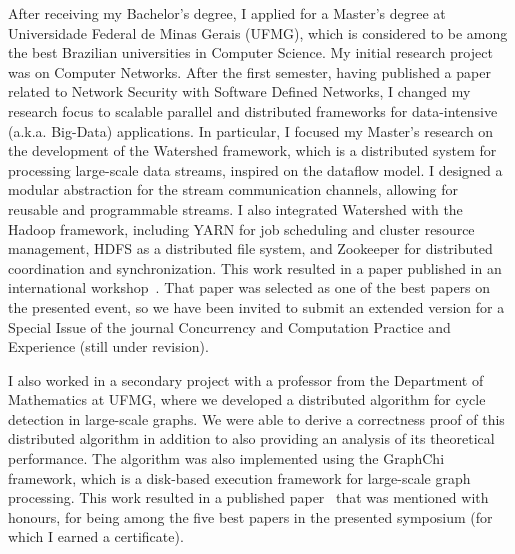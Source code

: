 \documentclass{article}
\begin{document}
After receiving my Bachelor's degree,
I applied for a Master's degree at
Universidade Federal de Minas Gerais (UFMG), which is considered to be among
the best Brazilian universities in Computer Science.
My initial research project was on Computer Networks.
After the first semester, having published a paper~\cite{rocha2013smtd}
related to Network Security with Software Defined Networks, I changed my research focus to scalable parallel
and distributed frameworks for data-intensive (a.k.a. Big-Data) applications.
In particular, I focused my Master's research on the development of the Watershed framework,
which is a distributed system for processing large-scale data streams, inspired on the dataflow model.
I designed a modular abstraction for the stream communication channels, allowing for
reusable and programmable streams. I also integrated Watershed with the Hadoop
framework, including YARN for job scheduling and cluster resource management,
HDFS as a distributed file system, and Zookeeper for distributed coordination
and synchronization. This work resulted in a paper published in an
international workshop~\cite{rocha2014watershed}. That paper was selected as
one of the best papers on the presented event, so we have been invited to
submit an extended version for a Special Issue of the journal Concurrency and
Computation Practice and Experience (still under revision).

I also worked in a secondary project with a professor from the Department of
Mathematics at UFMG, where we developed a distributed algorithm for cycle
detection in large-scale graphs. We were able to derive a correctness proof of
this distributed algorithm in addition to also providing an analysis of its
theoretical performance.  The algorithm was also implemented using the GraphChi
framework, which is a disk-based execution framework for large-scale graph
processing. This work resulted in a published paper~\cite{rocha2015cycles} that
was mentioned with honours, for being among the five best papers in the
presented symposium (for which I earned a certificate).
\end{document}
